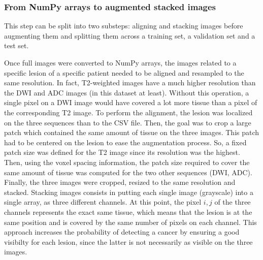 \newpage

\subsubsection{From NumPy arrays to augmented stacked images}
\label{sec:numpyToAugmentedStacked}
\setlength{\marginparwidth}{3cm}\leavevmode {}This step can be split into two substeps: aligning and stacking images before augmenting them and splitting them across a training set, a validation set and a test set.

Once full images were converted to NumPy arrays, the images related to a specific lesion of a specific patient needed to be aligned and resampled to the same resolution. In fact, T2-weighted images have a much higher resolution than the DWI and ADC images (in this dataset at least). Without this operation, a single pixel on a DWI image would have covered a lot more tissue than a pixel of the corresponding T2 image. To perform the alignment, the lesion was localized on the three sequences than to the CSV file. Then, the goal was to crop a large patch which contained the same amount of tissue on the three images. This patch had to be centered on the lesion to ease the augmentation process. So, a fixed patch size was defined for the T2 image since its resolution was the highest. Then, using the voxel spacing information, the patch size required to cover the same amount of tissue was computed for the two other sequences (DWI, ADC). Finally, the three images were cropped, resized to the same resolution and stacked. Stacking images consists in putting each single image (grayscale) into a single array, as three different channels. At this point, the pixel $i,j$ of the three channels represents the exact same tissue, which means that the lesion is at the same position and is covered by the same number of pixels on each channel. This approach increases the probability of detecting a cancer by ensuring a good visibilty for each lesion, since the latter is not necessarily as visible on the three images.

